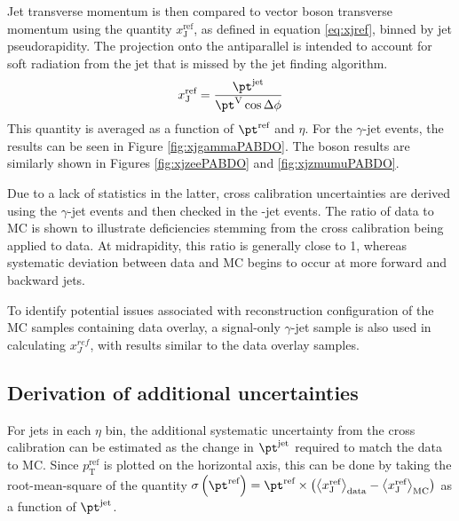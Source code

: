 \documentclass[NOTE, atlasdraft=true, texlive=2016, USenglish]{\ATLASLATEXPATH atlasdoc}
\begin{document}
Jet transverse momentum is then compared to vector boson transverse momentum using the quantity $x_{\text{J}}^{\text{ref}}$, as defined in equation \ref{eq:xjref}, binned by jet pseudorapidity. The projection onto the antiparallel is intended to account for soft radiation from the jet that is missed by the jet finding algorithm.
\begin{equation}
	x_{\text{J}}^{\text{ref}} = \frac{\pt^{\text{jet}}}{\pt^{\text{V}} \cos{\Delta\phi}}
	\label{eq:xjref}
\end{equation}
This quantity is averaged as a function of $\pt^{\text{ref}}$ and $\eta$. For the $\gamma$-jet events, the results can be seen in Figure \ref{fig:xjgammaPABDO}. The \Zboson boson results are similarly shown in Figures \ref{fig:xjzeePABDO} and \ref{fig:xjzmumuPABDO}.


Due to a lack of statistics in the latter, cross calibration uncertainties are derived using the $\gamma$-jet events and then checked in the \Zboson-jet events. The ratio of data to MC is shown to illustrate deficiencies stemming from the cross calibration being applied to data. At midrapidity, this ratio is generally close to 1, whereas systematic deviation between data and MC begins to occur at more forward and backward jets.\par
To identify potential issues associated with reconstruction configuration of the MC samples containing data overlay, a signal-only $\gamma$-jet sample is also used in calculating $x_J^{ref}$, with results similar to the data overlay samples.

\subsection{Derivation of additional uncertainties}
For jets in each $\eta$ bin, the additional systematic uncertainty from the cross calibration can be estimated as the change in $\pt^{\text{jet}}$ required to match the data to MC. Since $p_{\text{T}}^{\text{ref}}$ is plotted on the horizontal axis, this can be done by taking the root-mean-square of the quantity $\sigma \left(\pt^{\text{ref}}\right) = \pt^{\text{ref}} \times\left( \left< x_{\text{J}}^{\text{ref}} \right>_{\text{data}} - \left< x_{\text{J}}^{\text{ref}} \right>_{\text{MC}} \right)$ as a function of $\pt^{\text{jet}}$.
\end{document}
